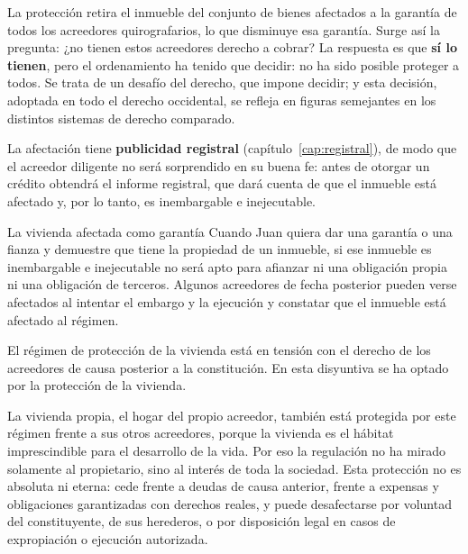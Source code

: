 \documentclass[12pt,oneside]{book}
\begin{document}
La protección retira el inmueble del conjunto de bienes afectados a la garantía de todos los acreedores quirografarios, lo que disminuye esa garantía. Surge así la pregunta: ¿no tienen estos acreedores derecho a cobrar? La respuesta es que \textbf{sí lo tienen}, pero el ordenamiento ha tenido que decidir: no ha sido posible proteger a todos. Se trata de un desafío del derecho, que impone decidir; y esta decisión, adoptada en todo el derecho occidental, se refleja en figuras semejantes en los distintos sistemas de derecho comparado.

La afectación tiene \textbf{publicidad registral} (capítulo~\ref{cap:registral}), de modo que el acreedor diligente no será sorprendido en su buena fe: antes de otorgar un crédito obtendrá el informe registral, que dará cuenta de que el inmueble está afectado y, por lo tanto, es inembargable e inejecutable.

\begin{ejemplo}{La vivienda afectada como garantía}
Cuando Juan quiera dar una garantía o una fianza y demuestre que tiene la propiedad de un inmueble, si ese inmueble es inembargable e inejecutable no será apto para afianzar ni una obligación propia ni una obligación de terceros. Algunos acreedores de fecha posterior pueden verse afectados al intentar el embargo y la ejecución y constatar que el inmueble está afectado al régimen.
\end{ejemplo}

\begin{importante}
El régimen de protección de la vivienda está en tensión con el derecho de los acreedores de causa posterior a la constitución. En esta disyuntiva se ha optado por la protección de la vivienda.
\end{importante}

La vivienda propia, el hogar del propio acreedor, también está protegida por este régimen frente a sus otros acreedores, porque la vivienda es el hábitat imprescindible para el desarrollo de la vida. Por eso la regulación no ha mirado solamente al propietario, sino al interés de toda la sociedad. Esta protección no es absoluta ni eterna: cede frente a deudas de causa anterior, frente a expensas y obligaciones garantizadas con derechos reales, y puede desafectarse por voluntad del constituyente, de sus herederos, o por disposición legal en casos de expropiación o ejecución autorizada.
\end{document}
